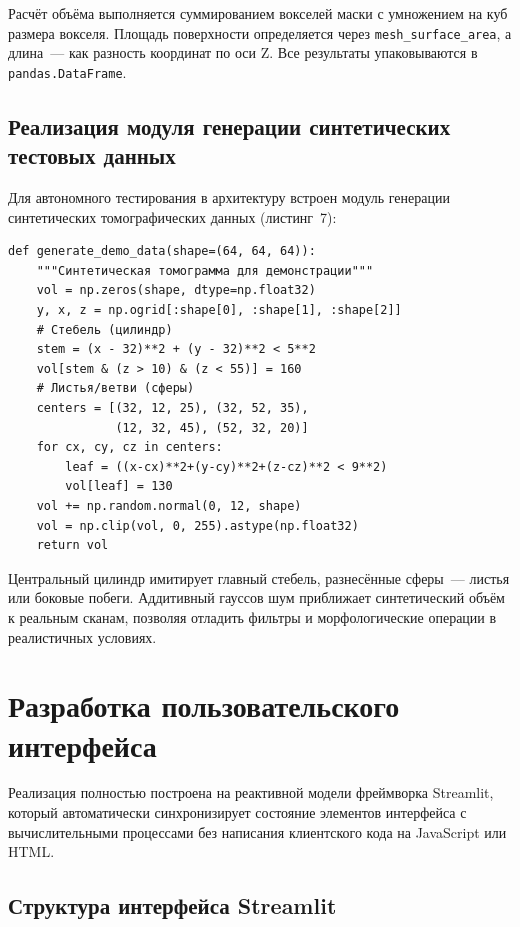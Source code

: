 \documentclass[14pt,a4paper]{extreport}
\begin{document}
Расчёт объёма выполняется суммированием вокселей маски с умножением на куб размера вокселя. Площадь поверхности определяется через \texttt{mesh\_surface\_area}, а длина~--- как разность координат по оси Z. Все результаты упаковываются в \texttt{pandas.DataFrame}.

\subsection{Реализация модуля генерации синтетических тестовых данных}

Для автономного тестирования в архитектуру встроен модуль генерации синтетических томографических данных (листинг~7):

\begin{lstlisting}[caption={Функция генерации синтетической томограммы растения}]
def generate_demo_data(shape=(64, 64, 64)):
    """Синтетическая томограмма для демонстрации"""
    vol = np.zeros(shape, dtype=np.float32)
    y, x, z = np.ogrid[:shape[0], :shape[1], :shape[2]]
    # Стебель (цилиндр)
    stem = (x - 32)**2 + (y - 32)**2 < 5**2
    vol[stem & (z > 10) & (z < 55)] = 160
    # Листья/ветви (сферы)
    centers = [(32, 12, 25), (32, 52, 35),
               (12, 32, 45), (52, 32, 20)]
    for cx, cy, cz in centers:
        leaf = ((x-cx)**2+(y-cy)**2+(z-cz)**2 < 9**2)
        vol[leaf] = 130
    vol += np.random.normal(0, 12, shape)
    vol = np.clip(vol, 0, 255).astype(np.float32)
    return vol
\end{lstlisting}

Центральный цилиндр имитирует главный стебель, разнесённые сферы~--- листья или боковые побеги. Аддитивный гауссов шум приближает синтетический объём к реальным сканам, позволяя отладить фильтры и морфологические операции в реалистичных условиях.

\section{Разработка пользовательского интерфейса}

Реализация полностью построена на реактивной модели фреймворка Streamlit, который автоматически синхронизирует состояние элементов интерфейса с вычислительными процессами без написания клиентского кода на JavaScript или HTML.

\subsection{Структура интерфейса Streamlit}
\end{document}
